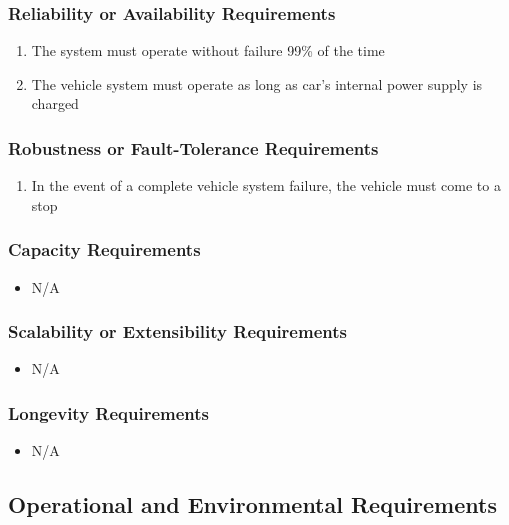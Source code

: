 \documentclass [12pt]{article}
\begin{document}
\subsubsection{Reliability or Availability  Requirements}
	\begin{enumerate}[label=\textbf{\Alph*}:]
		\item The system must operate without failure 99\% of the time
		\item The vehicle system must operate as long as car's internal power supply is charged
	\end{enumerate}



\subsubsection{Robustness or Fault-Tolerance Requirements }
	\begin{enumerate}[label=\textbf{\Alph*}:]
		\item In the event of a complete vehicle system failure, the vehicle must come to a stop
	\end{enumerate}
	
\subsubsection{Capacity Requirements }
	\begin{itemize}
		\item N/A
	\end{itemize}

\subsubsection{Scalability or Extensibility Requirements }
	\begin{itemize}
		\item N/A
	\end{itemize}
		
\subsubsection{Longevity Requirements }
	\begin{itemize}
		\item N/A
	\end{itemize}

\subsection{\large Operational and Environmental Requirements}
\end{document}

